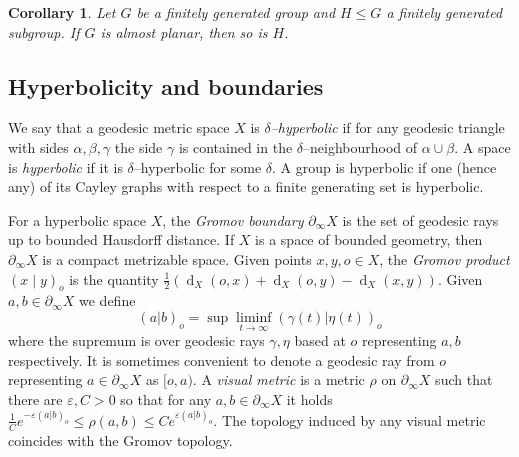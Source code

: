 \documentclass[11pt,a4paper]{amsart}
\DeclareMathOperator{\dist}{d}
\newcommand{\bdry}{\partial_\infty}
\newtheorem{proposition}[theorem]{Proposition}
\newtheorem{corollary}[theorem]{Corollary}
\theoremstyle{definition}
\begin{document}
\begin{corollary}
    Let $G$ be a finitely generated group and $H \leq G$ a finitely generated subgroup. If $G$ is almost planar, then so is $H$.
\end{corollary}

\subsection{Hyperbolicity and boundaries}
We say that a geodesic metric space $X$ is \emph{$\delta$--hyperbolic} if for any geodesic triangle with sides $\alpha, \beta, \gamma$ the side $\gamma$ is contained in the $\delta$--neighbourhood of $\alpha\cup \beta$. A space is \emph{hyperbolic} if it is $\delta$--hyperbolic for some $\delta$. A group is hyperbolic if one (hence any) of its Cayley graphs with respect to a finite generating set is hyperbolic. 

For a hyperbolic space $X$, the \emph{Gromov boundary} $\partial_\infty X$ is the set of geodesic rays up to bounded Hausdorff distance. If $X$ is a space of bounded geometry, then $\partial_\infty X$ is a compact metrizable space. Given points $x, y, o \in X$, the \emph{Gromov product} $(x \mid y)_o$ is the quantity $\frac{1}{2}\left( \dist_X (o, x) + \dist_X(o, y) - \dist_X(x,y)\right)$. Given $a,b \in \bdry X$ we define \[ (a | b)_o = \sup \liminf_{t \to \infty} (\gamma(t)|\eta(t))_o \] where the supremum is over geodesic rays $\gamma, \eta$ based at $o$ representing $a,b$ respectively.  It is sometimes convenient to denote a geodesic ray from $o$ representing $a \in \bdry X$ as $[o,a)$.  A \emph{visual metric} is a metric $\rho$ on $\partial_\infty X$  such that there are $\varepsilon, C>0$ so that for any $a, b \in \partial_\infty X$ it holds $\frac{1}{C}e^{-\varepsilon (a \vert b)_o} \leq \rho(a, b) \leq C e^{\varepsilon (a \vert b)_o}$. The topology induced by any visual metric coincides with the Gromov topology. 






\end{document}
